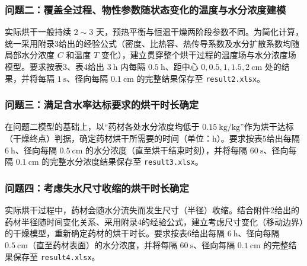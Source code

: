 \documentclass[12pt,a4paper]{article}
\newcommand{\prompt}[1]{\par\noindent\textbf{【写作提示】}#1\par}      %
\begin{document}
\subsubsection{问题二：覆盖全过程、物性参数随状态变化的温度与水分浓度建模}
实际烘干一般持续 $2\sim3$ 天，预热平衡与恒温干燥两阶段参数不同。为简化计算，统一采用附录3给出的经验公式（密度、比热容、热传导系数及水分扩散系数均随局部水分浓度 $C$ 和温度 $T$ 变化），建立贯穿整个烘干过程的温度场与水分浓度场模型。要求按表3、表4给出 $3\ \mathrm{h}$ 内每隔 $0.5\ \mathrm{h}$、距中心 $0, 0.5, 1, 1.5, 2\ \mathrm{cm}$ 处的结果，并将每隔 $1\ \mathrm{s}$、径向每隔 $0.1\ \mathrm{cm}$ 的完整结果保存至 \texttt{result2.xlsx}。

\subsubsection{问题三：满足含水率达标要求的烘干时长确定}
在问题二模型的基础上，以“药材各处水分浓度均低于 $0.15\ \mathrm{kg/kg}$”作为烘干达标（干燥终点）判据，确定药材烘干所需要的时间（单位：$\mathrm{h}$）。要求按表5给出每隔 $6\ \mathrm{h}$、径向每隔 $0.5\ \mathrm{cm}$ 的水分浓度（直至烘干结束时刻），并将每隔 $60\ \mathrm{s}$、径向每隔 $0.1\ \mathrm{cm}$ 的完整水分浓度结果保存至 \texttt{result3.xlsx}。

\subsubsection{问题四：考虑失水尺寸收缩的烘干时长确定}
实际烘干过程中，药材会随水分流失而发生尺寸（半径）收缩。结合附件2给出的药材半径随时间变化关系、采用附录4的经验公式，建立考虑尺寸变化（移动边界）的干燥模型，重新确定药材的烘干时长。要求按表6给出每隔 $6\ \mathrm{h}$、径向每隔 $0.5\ \mathrm{cm}$（直至药材表面）的水分浓度，并将每隔 $60\ \mathrm{s}$、径向每隔 $0.1\ \mathrm{cm}$ 的完整结果保存至 \texttt{result4.xlsx}。



\end{document}
